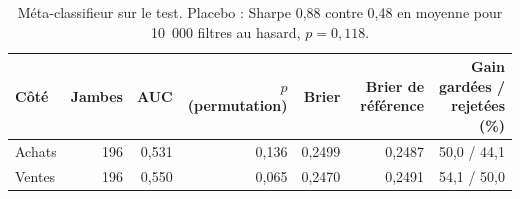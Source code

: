 \begin{table}[ht]
\centering
\small
\caption{Méta-classifieur sur le test. Placebo : Sharpe 0,88 contre 0,48 en moyenne pour 10~000 filtres au hasard, $p = 0,118$.}
\label{tab:meta}
\begin{tabular}{lrrrrrr}
\toprule
Côté & Jambes & AUC & $p$ (permutation) & Brier & Brier de référence & Gain gardées / rejetées (\%) \\
\midrule
Achats & 196 & 0,531 & 0,136 & 0,2499 & 0,2487 & 50,0 / 44,1 \\
Ventes & 196 & 0,550 & 0,065 & 0,2470 & 0,2491 & 54,1 / 50,0 \\
\bottomrule
\end{tabular}
\end{table}
